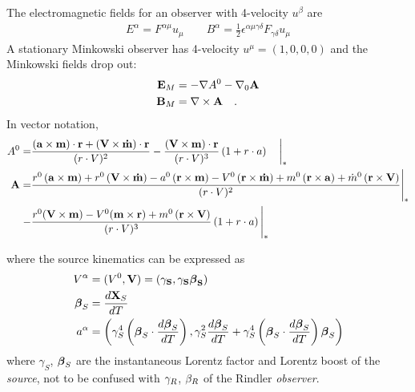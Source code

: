 \begin{widetext}
The electromagnetic fields for an observer with 4-velocity
$u^\beta$ are
\begin{align}
E^{\alpha} = F^{\alpha \mu} u_{\mu}    \qquad  B^{\alpha} =  \frac{1}{2} \epsilon^{\alpha \mu \gamma \delta}F_{\gamma \delta} u_{\mu}
\label{EBtoF}
\end{align}
A stationary Minkowski observer has 4-velocity $u^\mu=(1,0,0,0)$
and the Minkowski fields drop out:
\begin{align}
{\bf E}_M & = -{\mathbf \nabla} A^{0} - \nabla_0 {\bf A} \nonumber \\
{\bf B}_M & = {\mathbf \nabla} \times {\bf A} \quad .
\label{Eq:EMBM}
\end{align}
In vector notation, 
\begin{align}
\label{DipleSolnVec}
A^{0} = &   \frac{  \left(\mathbf{a}\times \mathbf{m} \right) \cdot
  \mathbf{r}  +  \left(\mathbf{V}\times \mathbf{\dot{m}} \right) \cdot
  \mathbf{r}}{(r\cdot V)^2}    - \frac{ \left(\mathbf{V}\times\mathbf{m}\right) \cdot
  \mathbf{r}} {(r\cdot V)^3}  \left( 1 + r\cdot a\right) \quad \bigg{|}_*   \nonumber \\
%
\mathbf{A}  = &
 \frac{ 
r^0\left(\mathbf{a}\times\mathbf{m}\right)  
+ 
r^0\left(\mathbf{V}\times\mathbf{\dot{m}} \right)
-  
a^0\left(\mathbf{r}\times\mathbf{m}\right) 
-
V^0  \left(\mathbf{r}\times\mathbf{\dot{m}}\right) 
+
m^0   \left(\mathbf{r}\times\mathbf{a}\right)  
+  
\dot{m}^0   \left(\mathbf{r}\times\mathbf{V}\right) }{(r\cdot V)^2}\Bigg{|}_{*} 
 \nonumber  \\ 
%
  -&  \frac{   
r^0( \mathbf{V}\times\mathbf{m} ) 
-
V^{0}  (\mathbf{m}\times\mathbf{r}) 
+ 
m^0 \left(\mathbf{r}\times\mathbf{V}\right) }{(r\cdot V)^3}  \left( 1 + r\cdot a\right) \Bigg{|}_{*}  
\end{align}
\end{widetext}
where the source kinematics can be expressed as
\begin{align}
\label{Eq:kinematics}
V^{\alpha} &= (V^0, \bf{V}) = (\gamma_S,  \gamma_S \boldsymbol{\beta}_S )   \\
{\boldsymbol \beta}_S &= \frac{d \mathbf{X}_S}{dT} \nonumber \\
a^{\alpha} &=  \left(\gamma_S^4 \left({\boldsymbol \beta}_S \cdot
\frac{d {\boldsymbol \beta}_S}{dT} \right), \gamma_S^2  \frac{d {\boldsymbol \beta}_S}{dT} +  \gamma_S^4
\left({\boldsymbol \beta}_S \cdot  \frac{d {\boldsymbol \beta}_S}{dT} \right) {\boldsymbol \beta}_S \right)  \nonumber
\end{align}
where $\gamma_S$, ${\boldsymbol \beta}_S$ are the instantaneous Lorentz factor and Lorentz
boost of the {\it source},  not to be confused with $\gamma_R$, $\beta_R$
of the Rindler {\it observer}.
